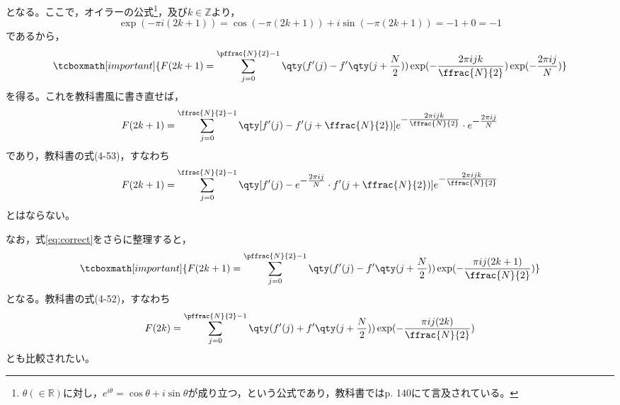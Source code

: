 \documentclass{ltjsarticle}
\begin{document}
となる。ここで，オイラーの公式\footnote{%
$\theta(\in\mathbb{R})$に対し，$e^{i\theta}=\cos\theta+i\sin\theta$が成り立つ，という公式であり，教科書ではp. 140にて言及されている。
}，及び$k\in\mathbb{Z}$より，
\begin{equation}
\exp(-\pi i(2k+1))
=\cos(-\pi(2k+1))+i\sin(-\pi(2k+1))
=-1+0
=-1
\end{equation}
であるから，
\begin{equation}
\tcboxmath[important]{%
F(2k+1)=\sum_{j=0}^{\pffrac{N}{2}-1}\qty(f'(j)-f'\qty(j+\frac{N}{2}))\exp(-\frac{2\pi ijk}{\ffrac{N}{2}})\exp(-\frac{2\pi ij}{N})
}
\label{eq:correct}
\end{equation}
を得る。これを教科書風に書き直せば，
\begin{equation}
F(2k+1)=\sum_{j=0}^{\ffrac{N}{2}-1}\qty[f'(j)-f'(j+\ffrac{N}{2})]e^{\textstyle-\frac{2\pi ijk}{\ffrac{N}{2}}}\cdot e^{\textstyle-\frac{2\pi ij}{N}}
\end{equation}
であり，教科書の式(4-53)，すなわち
\begin{equation}
F(2k+1)=\sum_{j=0}^{\ffrac{N}{2}-1}\qty[f'(j)-e^{\textstyle-\frac{2\pi ij}{N}}\cdot f'(j+\ffrac{N}{2})]e^{\textstyle-\frac{2\pi ijk}{\ffrac{N}{2}}}
\end{equation}
とはならない。\par
なお，式\eqref{eq:correct}をさらに整理すると，
\begin{equation}
\tcboxmath[important]{%
F(2k+1)=\sum_{j=0}^{\pffrac{N}{2}-1}\qty(f'(j)-f'\qty(j+\frac{N}{2}))\exp(-\frac{\pi ij(2k+1)}{\ffrac{N}{2}})
}
\end{equation}
となる。教科書の式(4-52)，すなわち
\begin{equation}
F(2k)=\sum_{j=0}^{\pffrac{N}{2}-1}\qty(f'(j)+f'\qty(j+\frac{N}{2}))\exp(-\frac{\pi ij(2k)}{\ffrac{N}{2}})
\end{equation}
とも比較されたい。
\end{document}
